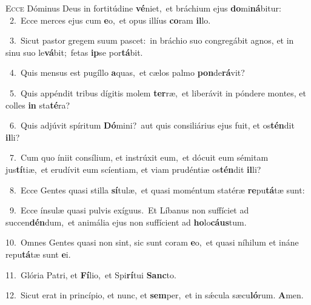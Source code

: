 \lettrine{\initial\textcolor{\initialcolor}{E}}{cce} Dóminus Deus in fortitúdine \textbf{vé}\-niet,~\star et bráchium ejus \textbf{do}\-mi\-\textbf{ná}\-bitur:\\
{\numbfont\textcolor{\numbcolor}{~2.}}~Ecce merces ejus cum \textbf{e}\-o,~\star et opus illíus \textbf{co}\-ram \textbf{il}\-lo.\par
{\numbfont\textcolor{\numbcolor}{~3.}}~Sicut pastor gregem suum pascet:~\dagger in bráchio suo congregábit agnos, et in sinu suo le\-\textbf{vá}\-bit;~\star fetas \textbf{ip}\-se por\-\textbf{tá}\-bit.\par
{\numbfont\textcolor{\numbcolor}{~4.}}~Quis mensus est pugíllo \textbf{a}\-quas,~\star et cælos palmo \textbf{pon}\-de\-\textbf{rá}\-vit?\par
{\numbfont\textcolor{\numbcolor}{~5.}}~Quis appéndit tribus dígitis molem \textbf{ter}\-ræ,~\star et liberávit in póndere montes, et colles \textbf{in} sta\-\textbf{té}\-ra?\par
{\numbfont\textcolor{\numbcolor}{~6.}}~Quis adjúvit spíritum \textbf{Dó}\-mini?~\star aut quis consiliárius ejus fuit, et os\-\textbf{tén}\-dit \textbf{il}\-li?\par
{\numbfont\textcolor{\numbcolor}{~7.}}~Cum quo íniit consílium, et instrúxit eum,~\dagger et dócuit eum sémitam jus\-\textbf{tí}\-tiæ,~\star et erudívit eum scíentiam, et viam prudéntiæ os\-\textbf{tén}\-dit \textbf{il}\-li?\par
{\numbfont\textcolor{\numbcolor}{~8.}}~Ecce Gentes quasi stilla \textbf{sí}\-tulæ,~\star et quasi moméntum statéræ \textbf{re}\-pu\-\textbf{tá}\-tæ sunt:\par
{\numbfont\textcolor{\numbcolor}{~9.}}~Ecce ínsulæ quasi pulvis exíguus.~\dagger Et Líbanus non suffíciet ad succen\-\textbf{dén}\-dum,~\star et animália ejus non suffícient ad \textbf{ho}\-lo\-\textbf{cáus}\-tum.\par
{\numbfont\textcolor{\numbcolor}{10.}}~Omnes Gentes quasi non sint, sic sunt coram \textbf{e}\-o,~\star et quasi níhilum et ináne repu\-\textbf{tá}\-tæ sunt \textbf{e}\-i.\par
{\numbfont\textcolor{\numbcolor}{11.}}~Glória Patri, et \textbf{Fí}\-lio,~\star et Spi\-\textbf{rí}\-tui \textbf{Sanc}\-to.\par
{\numbfont\textcolor{\numbcolor}{12.}}~Sicut erat in princípio, et nunc, et \textbf{sem}\-per,~\star et in sǽcula sæcu\-\textbf{ló}\-rum. \textbf{A}\-men.\par
